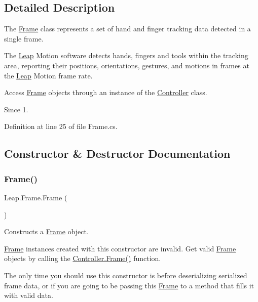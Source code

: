 \subsection{Detailed Description}
The \mbox{\hyperlink{class_leap_1_1_frame}{Frame}} class represents a set of hand and finger tracking data detected in a single frame. 

The \mbox{\hyperlink{namespace_leap}{Leap}} Motion software detects hands, fingers and tools within the tracking area, reporting their positions, orientations, gestures, and motions in frames at the \mbox{\hyperlink{namespace_leap}{Leap}} Motion frame rate.

Access \mbox{\hyperlink{class_leap_1_1_frame}{Frame}} objects through an instance of the \mbox{\hyperlink{class_leap_1_1_controller}{Controller}} class. \begin{DoxySince}{Since}
1. 
\end{DoxySince}


Definition at line 25 of file Frame.\+cs.



\subsection{Constructor \& Destructor Documentation}
\mbox{\label{class_leap_1_1_frame_a12db521b197948c89f8330f69333ddcc}} 
\subsubsection{\texorpdfstring{Frame()}{Frame()}\hspace{0.1cm}{\footnotesize\ttfamily [1/2]}}
{\footnotesize\ttfamily Leap.\+Frame.\+Frame (\begin{DoxyParamCaption}{ }\end{DoxyParamCaption})}



Constructs a \mbox{\hyperlink{class_leap_1_1_frame}{Frame}} object. 

\mbox{\hyperlink{class_leap_1_1_frame}{Frame}} instances created with this constructor are invalid. Get valid \mbox{\hyperlink{class_leap_1_1_frame}{Frame}} objects by calling the \mbox{\hyperlink{class_leap_1_1_controller_ac41dc9c50a3bd2a892cc44af0859ef0d}{Controller.\+Frame()}} function.

The only time you should use this constructor is before deserializing serialized frame data, or if you are going to be passing this \mbox{\hyperlink{class_leap_1_1_frame}{Frame}} to a method that fills it with valid data.

